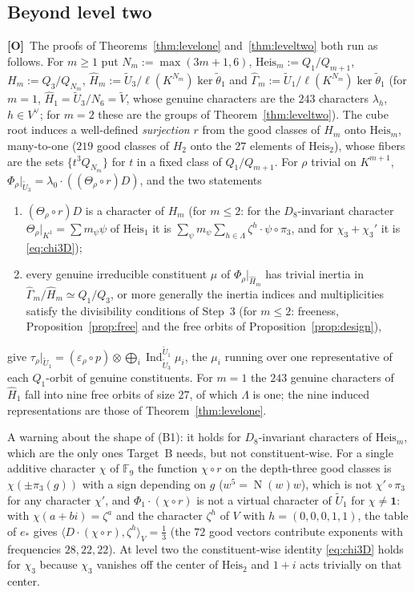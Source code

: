 \documentclass[11pt]{article}
\newcommand{\Fq}{\mathbb F}
\newcommand{\Nm}{\operatorname N}
\newcommand{\Ind}{\operatorname{Ind}}
\newcommand{\tU}{\widetilde U}
\newcommand{\tV}{\widetilde V}
\newcommand{\tth}{\widetilde\theta}
\newcommand{\Otag}{\textnormal{\textbf{[O]}}}
\theoremstyle{plain}
\theoremstyle{definition}
\begin{document}
\subsection{Beyond level two}\label{subsec:cuberoot}
\Otag\ The proofs of Theorems~\ref{thm:levelone} and~\ref{thm:leveltwo}
both run as follows.  For $m\ge1$ put $N_m:=\max(3m+1,6)$,
$\mathrm{Heis}_m:=Q_1/Q_{m+1}$, $H_m:=Q_3/Q_{N_m}$,
$\hat H_m:=\tU_3/\ell(K^{N_m})\ker\tth_1$ and
$\hat\Gamma_m:=\tU_1/\ell(K^{N_m})\ker\tth_1$ (for $m=1$, $\hat H_1=\tU_3/N_6=\tV$,
whose genuine characters are the $243$ characters $\lambda_h$,
$h\in V^\vee$; for $m=2$ these are the groups of
Theorem~\ref{thm:leveltwo}).  The cube root induces a well-defined
\emph{surjection} $r$ from the good classes of $H_m$ onto
$\mathrm{Heis}_m$, many-to-one ($219$ good classes of $H_2$ onto the
$27$ elements of $\mathrm{Heis}_2$), whose fibers are the sets
$\{t^3Q_{N_m}\}$ for $t$ in a fixed class of $Q_1/Q_{m+1}$.  For
$\rho$ trivial on $K^{m+1}$, $\Phi_\rho|_{\tU_3}=\lambda_0\cdot((\Theta_\rho\circ r)D)$,
and the two statements
\begin{enumerate}[label=(B\arabic*)]
\item $(\Theta_\rho\circ r)D$ is a character of $H_m$ (for $m\le2$: for
the $D_8$-invariant character $\Theta_\rho|_{K^1}=\sum m_\psi\psi$ of
$\mathrm{Heis}_1$ it is $\sum_\psi m_\psi\sum_{h\in\Lambda}\zeta^h\cdot\psi\circ\pi_3$,
and for $\chi_3+\chi_3'$ it is \eqref{eq:chi3D});
\item every genuine irreducible constituent $\mu$ of $\Phi_\rho|_{\hat H_m}$
has trivial inertia in $\hat\Gamma_m/\hat H_m\simeq Q_1/Q_3$, or more
generally the inertia indices and multiplicities satisfy the
divisibility conditions of Step~3 (for $m\le2$: freeness,
Proposition~\ref{prop:free} and the free orbits of
Proposition~\ref{prop:design}),
\end{enumerate}
give $\tau_\rho|_{\tU_1}=(\varepsilon_\rho\circ p)\otimes\bigoplus_i\Ind_{\tU_3}^{\tU_1}\mu_i$,
the $\mu_i$ running over one representative of each $Q_1$-orbit of
genuine constituents.  For $m=1$ the $243$ genuine characters of
$\hat H_1$ fall into nine free orbits of size $27$, of which $\Lambda$
is one; the nine induced representations are those of
Theorem~\ref{thm:levelone}.

A warning about the shape of (B1): it holds for $D_8$-invariant
characters of $\mathrm{Heis}_m$, which are the only ones Target~B needs,
but not constituent-wise.  For a single additive character $\chi$ of
$\Fq_9$ the function $\chi\circ r$ on the depth-three good classes is
$\chi(\pm\pi_3(g))$ with a sign depending on $g$ ($w^5=\Nm(w)w$), which
is not $\chi'\circ\pi_3$ for any character $\chi'$, and
$\Phi_1\cdot(\chi\circ r)$ is not a virtual character of $\tU_1$ for
$\chi\ne\mathbf1$: with $\chi(a+bi)=\zeta^a$ and the character $\zeta^{h}$
of $V$ with $h=(0,0,0,1,1)$, the table of $e_*$ gives
$\langle D\cdot(\chi\circ r),\zeta^h\rangle_V=\tfrac13$ (the $72$ good
vectors contribute exponents with frequencies $28,22,22$).  At level two
the constituent-wise identity \eqref{eq:chi3D} holds for $\chi_3$
because $\chi_3$ vanishes off the center of $\mathrm{Heis}_2$ and
$1+i$ acts trivially on that center.
\end{document}
